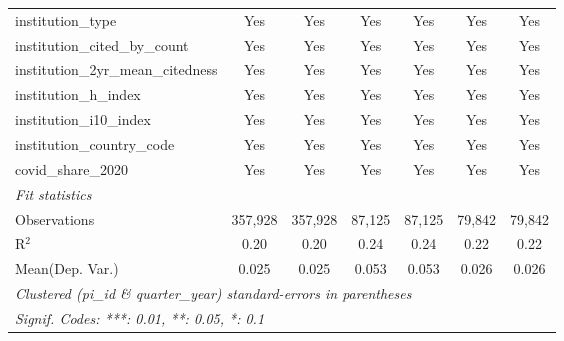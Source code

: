 \begin{tabular}{lcccccc}
   institution\_type                                           & Yes            & Yes            & Yes            & Yes            & Yes            & Yes\\  
   institution\_cited\_by\_count                               & Yes            & Yes            & Yes            & Yes            & Yes            & Yes\\  
   institution\_2yr\_mean\_citedness                           & Yes            & Yes            & Yes            & Yes            & Yes            & Yes\\  
   institution\_h\_index                                       & Yes            & Yes            & Yes            & Yes            & Yes            & Yes\\  
   institution\_i10\_index                                     & Yes            & Yes            & Yes            & Yes            & Yes            & Yes\\  
   institution\_country\_code                                  & Yes            & Yes            & Yes            & Yes            & Yes            & Yes\\  
   covid\_share\_2020                                          & Yes            & Yes            & Yes            & Yes            & Yes            & Yes\\  
   \midrule
   \emph{Fit statistics}\\
   Observations                                                & 357,928        & 357,928        & 87,125         & 87,125         & 79,842         & 79,842\\  
   R$^2$                                                       & 0.20           & 0.20           & 0.24           & 0.24           & 0.22           & 0.22\\  
Mean(Dep. Var.) & 0.025 & 0.025 & 0.053 & 0.053 & 0.026 & 0.026 \\
   \midrule \midrule
   \multicolumn{7}{l}{\emph{Clustered (pi\_id \& quarter\_year) standard-errors in parentheses}}\\
   \multicolumn{7}{l}{\emph{Signif. Codes: ***: 0.01, **: 0.05, *: 0.1}}\\
\end{tabular}
\par\endgroup
